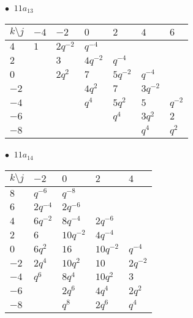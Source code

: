 \begin{minipage}{\linewidth}
$\bullet\ $ $11a_{13}$ \vspace{0.5em} \\
\begin{tabular}{l|llllll}
$k \setminus j$ & $-4$ & $-2$ & $0$ & $2$ & $4$ & $6$ \\
\hline
$4$ & $1$ & $2q^{-2}$ & $q^{-4}$ &  &  &  \\
$2$ &  & $3$ & $4q^{-2}$ & $q^{-4}$ &  &  \\
$0$ &  & $2q^{2}$ & $7$ & $5q^{-2}$ & $q^{-4}$ &  \\
$-2$ &  &  & $4q^{2}$ & $7$ & $3q^{-2}$ &  \\
$-4$ &  &  & $q^{4}$ & $5q^{2}$ & $5$ & $q^{-2}$ \\
$-6$ &  &  &  & $q^{4}$ & $3q^{2}$ & $2$ \\
$-8$ &  &  &  &  & $q^{4}$ & $q^{2}$ \\
\end{tabular}
\vspace{2em}
\end{minipage}
%
\begin{minipage}{\linewidth}
$\bullet\ $ $11a_{14}$ \vspace{0.5em} \\
\begin{tabular}{l|llll}
$k \setminus j$ & $-2$ & $0$ & $2$ & $4$ \\
\hline
$8$ & $q^{-6}$ & $q^{-8}$ &  &  \\
$6$ & $2q^{-4}$ & $2q^{-6}$ &  &  \\
$4$ & $6q^{-2}$ & $8q^{-4}$ & $2q^{-6}$ &  \\
$2$ & $6$ & $10q^{-2}$ & $4q^{-4}$ &  \\
$0$ & $6q^{2}$ & $16$ & $10q^{-2}$ & $q^{-4}$ \\
$-2$ & $2q^{4}$ & $10q^{2}$ & $10$ & $2q^{-2}$ \\
$-4$ & $q^{6}$ & $8q^{4}$ & $10q^{2}$ & $3$ \\
$-6$ &  & $2q^{6}$ & $4q^{4}$ & $2q^{2}$ \\
$-8$ &  & $q^{8}$ & $2q^{6}$ & $q^{4}$ \\
\end{tabular}
\vspace{2em}
\end{minipage}
%
